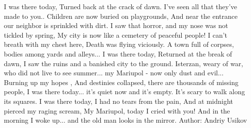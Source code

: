  
 
 
 
 

I was there today,
Turned back at the crack of dawn.
I've seen all that they've made to you..
Children are now buried on playgrounds,
And near the entrance our neighbor is sprinkled with dirt.
I saw that horror, and my nose was not tickled by spring,
My city is now like a cemetery of peaceful people!
I can't breath with my chest here,
Death was flying viciously.
A town full of corpses,
bodies among yards and alleys...
I was there today,
Returned at the break of dawn,
I saw the ruins and a banished city to the ground. Isterzan, weary of war, who did not live to see summer...
my Mariupol - now only dust and evil...
Burning up my hopes ,
And destinies collapsed, there are thousands of missing people,
I was there today... it's quiet now and it's empty. It's scary to walk along its squares.
I was there today,
I had no tears from the pain,
And at midnight pierced my raging scream,
My Mariupol, today I cried with you!
And in the morning I woke up... and the old man looks in the mirror.
Author: Andriy Usikov
